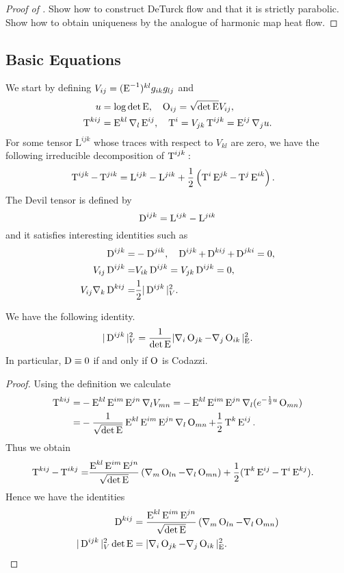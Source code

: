\documentclass[a4paper, 12pt]{amsart}
\begin{document}
\begin{proof}[Proof of ]
{\color{red} Show how to construct DeTurck flow and that it is strictly parabolic. Show how to obtain uniqueness by the analogue of harmonic map heat flow.}
\end{proof}

\subsection{Basic Equations}
\label{subsec:xcf_eq}
We start by defining \(V_{ij}=(\operatorname{E}^{-1})^{kl}g_{ik}g_{lj}\)
and
\begin{align}
u&=\log\det\operatorname{E},\quad
\operatorname{O}_{ij}=\sqrt{\det\operatorname{E}}V_{ij},\\
\operatorname{T}^{kij}&=\operatorname{E}^{kl}\nabla_l \operatorname{E}^{ij},\quad \operatorname{T}^i=V_{jk}\operatorname{T}^{ijk}=\operatorname{E}^{ij}\nabla_ju.
\end{align}
For some tensor $\mathrm{L}^{ijk}$ whose traces with respect to $V_{kl}$ are zero, we have the following irreducible decomposition of $\operatorname{T}^{ijk}:$
\begin{align}
\operatorname{T}^{ijk}-\operatorname{T}^{jik}&=\mathrm{L}^{ijk}-\mathrm{L}^{jik}+\frac{1}{2}\left(\operatorname{T}^i\operatorname{E}^{jk}-\operatorname{T}^j\operatorname{E}^{ik}\right).
\end{align}
The Devil tensor is defined by
\[\operatorname{D}^{ijk}=\mathrm{L}^{ijk}-\mathrm{L}^{jik}\]
and it satisfies interesting identities such as
\begin{align}
\operatorname{D}^{ijk}=&-\operatorname{D}^{jik},\quad \operatorname{D}^{ijk}+\operatorname{D}^{kij}+\operatorname{D}^{jki}=0,\\
V_{ij}\operatorname{D}^{ijk}=&V_{ik}\operatorname{D}^{ijk}=V_{jk}\operatorname{D}^{ijk}=0,\\
V_{ij}\nabla_k\operatorname{D}^{kij}=&\frac{1}{2}|\operatorname{D}^{ijk}|_V^2.
\end{align}
\begin{lemma}
\label{lem:cubicform_codazzi}
We have the following identity.
\begin{align}
|\operatorname{D}^{ijk}|_V^2=\frac{1}{\det\operatorname{E}}|\nabla_i\operatorname{O}_{jk}-\nabla_j\operatorname{O}_{ik}|_{\operatorname{E}}^2.
\end{align}
In particular, \(\operatorname{D}\equiv 0\) if and only if \(\operatorname{O}\) is Codazzi.
\end{lemma}
\begin{proof}
Using the definition we calculate
\begin{align}
\operatorname{T}^{kij}=&-\operatorname{E}^{kl}\operatorname{E}^{im}\operatorname{E}^{jn}\nabla_l V_{mn}=-\operatorname{E}^{kl}\operatorname{E}^{im}\operatorname{E}^{jn}\nabla_l (e^{-\frac{1}{2}u}\operatorname{O}_{mn})\\
=&-\frac{1}{\sqrt{\det\operatorname{E}}}\operatorname{E}^{kl}\operatorname{E}^{im}\operatorname{E}^{jn}\nabla_l \operatorname{O}_{mn}+\frac{1}{2}\operatorname{T}^k\operatorname{E}^{ij}.
\end{align}
Thus we obtain
\begin{align*}
\operatorname{T}^{kij}-\operatorname{T}^{ikj}=&\frac{\operatorname{E}^{kl}\operatorname{E}^{im}\operatorname{E}^{jn}}{\sqrt{\det\operatorname{E}}}\left(\nabla_m \operatorname{O}_{ln}-\nabla_l \operatorname{O}_{mn}\right)+\frac{1}{2}(\operatorname{T}^k\operatorname{E}^{ij}-\operatorname{T}^i\operatorname{E}^{kj}).
\end{align*}
Hence we have the identities
\begin{align}
\operatorname{D}^{kij}&=\frac{\operatorname{E}^{kl}\operatorname{E}^{im}\operatorname{E}^{jn}}{\sqrt{\det\operatorname{E}}}\left(\nabla_m \operatorname{O}_{ln}-\nabla_l \operatorname{O}_{mn}\right)\\
|\operatorname{D}^{ijk}|_V^2\det\operatorname{E}&=|\nabla_i\operatorname{O}_{jk}-\nabla_j\operatorname{O}_{ik}|_{\operatorname{E}}^2.
\end{align}
\end{proof}
\end{document}

